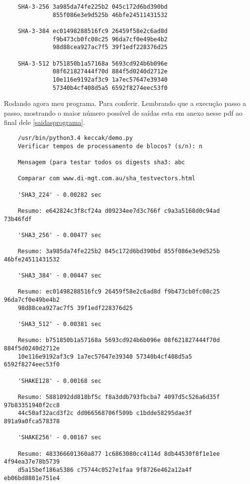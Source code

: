\documentclass[12pt, a4paper]{article}
\begin{document}
\begin{enumerate}
\begin{enumerate}
\begin{verbatim}
    SHA-3-256 3a985da74fe225b2 045c172d6bd390bd
              855f086e3e9d525b 46bfe24511431532

    SHA-3-384 ec01498288516fc9 26459f58e2c6ad8d
              f9b473cb0fc08c25 96da7cf0e49be4b2
              98d88cea927ac7f5 39f1edf228376d25

    SHA-3-512 b751850b1a57168a 5693cd924b6b096e
              08f621827444f70d 884f5d0240d2712e
              10e116e9192af3c9 1a7ec57647e39340
              57340b4cf408d5a5 6592f8274eec53f0
  \end{verbatim}

  Rodando agora meu programa. Para conferir. Lembrando que a execução passo a
  passo, mostrando o maior número possível de saídas esta em anexo nesse pdf ao
  final dele \ref{saidasprograma}.\\

  \begin{verbatim}
    /usr/bin/python3.4 keccak/demo.py
    Verificar tempos de processamento de blocos? (s/n): n

    Mensagem (para testar todos os digests sha3: abc

    Comparar com www.di-mgt.com.au/sha_testvectors.html

    'SHA3_224' - 0.00282 sec

    Resumo: e642824c3f8cf24a d09234ee7d3c766f c9a3a5168d0c94ad 73b46fdf

    'SHA3_256' - 0.00477 sec

    Resumo: 3a985da74fe225b2 045c172d6bd390bd 855f086e3e9d525b 46bfe24511431532

    'SHA3_384' - 0.00447 sec

    Resumo: ec01498288516fc9 26459f58e2c6ad8d f9b473cb0fc08c25 96da7cf0e49be4b2
    98d88cea927ac7f5 39f1edf228376d25

    'SHA3_512' - 0.00381 sec

    Resumo: b751850b1a57168a 5693cd924b6b096e 08f621827444f70d 884f5d0240d2712e
    10e116e9192af3c9 1a7ec57647e39340 57340b4cf408d5a5 6592f8274eec53f0

    'SHAKE128' - 0.00168 sec

    Resumo: 5881092dd818bf5c f8a3ddb793fbcba7 4097d5c526a6d35f 97b83351940f2cc8
    44c50af32acd3f2c dd066568706f509b c1bdde58295dae3f 891a9a0fca578378

    'SHAKE256' - 0.00167 sec

    Resumo: 483366601360a877 1c6863080cc4114d 8db44530f8f1e1ee 4f94ea37e78b5739
    d5a15bef186a5386 c75744c0527e1faa 9f8726e462a12a4f eb06bd8801e751e4
  \end{verbatim}
\end{enumerate}


\end{enumerate}
\end{document}

